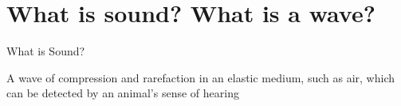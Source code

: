\part{What is sound? What is a wave?}
\frame{\partpage}

\begin{frame}{What is Sound?}
	\begin{center}
		 A wave of compression and rarefaction in an elastic medium, such as air, which can be detected by an animal’s sense of hearing 
	\end{center}
\end{frame}

\begin{frame}
\end{frame}

